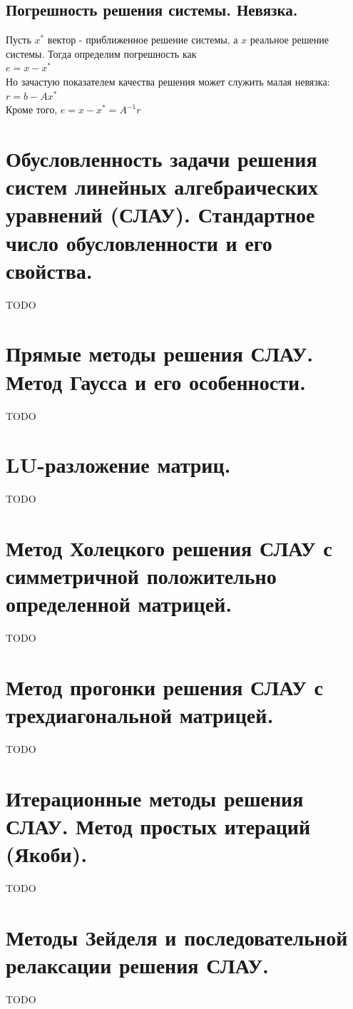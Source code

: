 \documentclass[16pt]{article}
\begin{document}
            \subsection{Погрешность решения системы. Невязка.}
            Пусть $x^{*}$ вектор - приближенное решение системы, а $x$ реальное решение системы. Тогда определим погрешность как\\
            $e = x - x^{*}$\\
            Но зачастую показателем качества решения может служить малая невязка:\\
            $r = b-Ax^{*}$\\
            Кроме того, $e = x-x^{*} = A^{-1}r$            
		\section{Обусловленность задачи решения систем линейных алгебраических уравнений (СЛАУ). Стандартное число обусловленности и его свойства.}
			TODO
			
		\section{Прямые методы решения СЛАУ. Метод Гаусса и его особенности.}
			TODO
			
		\section{LU-разложение матриц.}
			TODO
			
		\section{Метод Холецкого решения СЛАУ с симметричной положительно определенной матрицей.}
			TODO
			
		\section{Метод прогонки решения СЛАУ с трехдиагональной матрицей.}
			TODO
			
		\section{Итерационные методы решения СЛАУ. Метод простых итераций (Якоби).}
			TODO
			
		\section{Методы Зейделя и последовательной релаксации решения СЛАУ.}
			TODO
			
\end{document}
